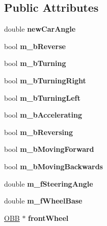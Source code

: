 \subsection*{Public Attributes}
\begin{DoxyCompactItemize}
\item 
\hypertarget{class_car_a289cdb8c2543e9a1d839b8ddcdaee6e9}{}double {\bfseries new\+Car\+Angle}\label{class_car_a289cdb8c2543e9a1d839b8ddcdaee6e9}

\item 
\hypertarget{class_car_ad980480078835395aec6a141bf53cd27}{}bool {\bfseries m\+\_\+b\+Reverse}\label{class_car_ad980480078835395aec6a141bf53cd27}

\item 
\hypertarget{class_car_afaecfed34dc76325c243c8fad8107ad0}{}bool {\bfseries m\+\_\+b\+Turning}\label{class_car_afaecfed34dc76325c243c8fad8107ad0}

\item 
\hypertarget{class_car_a1caa04bed661507cc92dcc465374aa40}{}bool {\bfseries m\+\_\+b\+Turning\+Right}\label{class_car_a1caa04bed661507cc92dcc465374aa40}

\item 
\hypertarget{class_car_ab15cb88a73253d2d258368bed12be6cc}{}bool {\bfseries m\+\_\+b\+Turning\+Left}\label{class_car_ab15cb88a73253d2d258368bed12be6cc}

\item 
\hypertarget{class_car_a3ca299e37b7a2b964e68877e7fc41d56}{}bool {\bfseries m\+\_\+b\+Accelerating}\label{class_car_a3ca299e37b7a2b964e68877e7fc41d56}

\item 
\hypertarget{class_car_a8a5ba2979820d7c0f2a00571fd7755de}{}bool {\bfseries m\+\_\+b\+Reversing}\label{class_car_a8a5ba2979820d7c0f2a00571fd7755de}

\item 
\hypertarget{class_car_a7f45340643c43ddd543d96662fe88911}{}bool {\bfseries m\+\_\+b\+Moving\+Forward}\label{class_car_a7f45340643c43ddd543d96662fe88911}

\item 
\hypertarget{class_car_aa0d61fbdec7ad2a76c1551fe26877cda}{}bool {\bfseries m\+\_\+b\+Moving\+Backwards}\label{class_car_aa0d61fbdec7ad2a76c1551fe26877cda}

\item 
\hypertarget{class_car_aad186bfd45a0f927e00b8e40440b56c4}{}double {\bfseries m\+\_\+f\+Steering\+Angle}\label{class_car_aad186bfd45a0f927e00b8e40440b56c4}

\item 
\hypertarget{class_car_a7be779b298ee9803e8189e08f0cafc27}{}double {\bfseries m\+\_\+f\+Wheel\+Base}\label{class_car_a7be779b298ee9803e8189e08f0cafc27}

\item 
\hypertarget{class_car_a537806fdf2f561ff245bdbc72c271a81}{}\hyperlink{class_o_b_b}{O\+B\+B} $\ast$ {\bfseries front\+Wheel}\label{class_car_a537806fdf2f561ff245bdbc72c271a81}

\end{DoxyCompactItemize}
